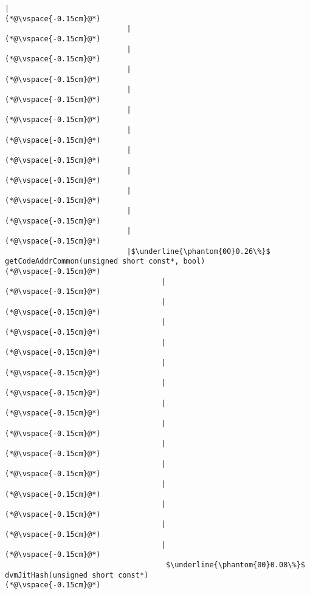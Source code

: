 \begin{lstlisting}[caption=Staattinen metodi Java$\to$C , label=profile:J2CBenchmark00001, numberbychapter=true, frame=lines, float, floatplacement=t]
                            |
(*@\vspace{-0.15cm}@*)
                            |
(*@\vspace{-0.15cm}@*)
                            |
(*@\vspace{-0.15cm}@*)
                            |
(*@\vspace{-0.15cm}@*)
                            |
(*@\vspace{-0.15cm}@*)
                            |
(*@\vspace{-0.15cm}@*)
                            |
(*@\vspace{-0.15cm}@*)
                            |
(*@\vspace{-0.15cm}@*)
                            |
(*@\vspace{-0.15cm}@*)
                            |
(*@\vspace{-0.15cm}@*)
                            |
(*@\vspace{-0.15cm}@*)
                            |
(*@\vspace{-0.15cm}@*)
                            |$\underline{\phantom{00}0.26\%}$ getCodeAddrCommon(unsigned short const*, bool)
(*@\vspace{-0.15cm}@*)
                                    |
(*@\vspace{-0.15cm}@*)
                                    |
(*@\vspace{-0.15cm}@*)
                                    |
(*@\vspace{-0.15cm}@*)
                                    |
(*@\vspace{-0.15cm}@*)
                                    |
(*@\vspace{-0.15cm}@*)
                                    |
(*@\vspace{-0.15cm}@*)
                                    |
(*@\vspace{-0.15cm}@*)
                                    |
(*@\vspace{-0.15cm}@*)
                                    |
(*@\vspace{-0.15cm}@*)
                                    |
(*@\vspace{-0.15cm}@*)
                                    |
(*@\vspace{-0.15cm}@*)
                                    |
(*@\vspace{-0.15cm}@*)
                                    |
(*@\vspace{-0.15cm}@*)
                                    |
(*@\vspace{-0.15cm}@*)
                                     $\underline{\phantom{00}0.08\%}$ dvmJitHash(unsigned short const*)
(*@\vspace{-0.15cm}@*)
                             

\end{lstlisting}
